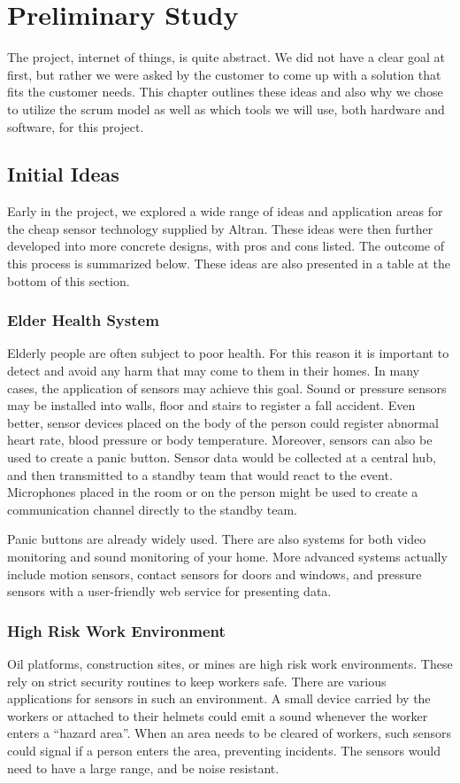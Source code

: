 \documentclass[../document]{subfiles}
\begin{document}
\section{Preliminary Study}
\label{sec:preliminary_study}
The project, internet of things, is quite abstract. We did not have a clear goal at first, but rather we were asked by the customer to come up with a solution that fits the customer needs. This chapter outlines these ideas and also why we chose to utilize the scrum model as well as which tools we will use, both hardware and software, for this project.

\subsection{Initial Ideas}
\label{subsec:initial_ideas}
Early in the project, we explored a wide range of ideas and application areas for the cheap sensor technology supplied by \gls{Altran}. These ideas were then further developed into more concrete designs, with pros and cons listed. The outcome of this process is summarized below. These ideas are also presented in a table at the bottom of this section.

\subsubsection{Elder Health System}
Elderly people are often subject to poor health. For this reason it is important to detect and avoid any harm that may come to them in their homes. In many cases, the application of sensors may achieve this goal. Sound or pressure sensors may be installed into walls, floor and stairs to register a fall accident. Even better, sensor devices placed on the body of the person could register abnormal heart rate, blood pressure or body temperature. Moreover, sensors can also be used to create a panic button. Sensor data would be collected at a central hub, and then transmitted to a standby team that would react to the event. Microphones placed in the room or on the person might be used to create a communication channel directly to the standby team.

Panic buttons are already widely used. There are also systems for both video monitoring and sound monitoring of your home. More advanced systems actually include motion sensors, contact sensors for doors and windows, and pressure sensors with a user-friendly web service for presenting data.

\subsubsection{High Risk Work Environment}
Oil platforms, construction sites, or mines are high risk work environments. These rely on strict security routines to keep workers safe. There are various applications for sensors in such an environment. A small device carried by the workers or attached to their helmets could emit a sound whenever the worker enters a “hazard area”. When an area needs to be cleared of workers, such sensors could signal if a person enters the area, preventing incidents. The sensors would need to have a large range, and be noise resistant.
\end{document}
